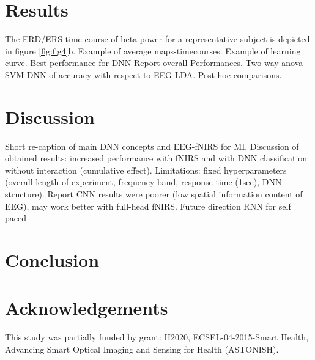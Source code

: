 \documentclass[12pt ]{iopart}
\begin{document}
\subsection{}
\section{Results}
The ERD/ERS time course of beta power for a representative subject is depicted in figure \ref{fig:fig4}b.
Example of average maps-timecourses.
Example of learning curve.
Best performance for DNN
Report overall Performances.
Two way anova SVM DNN of accuracy with respect to EEG-LDA.
Post hoc comparisons.

\section{Discussion}
Short re-caption of main DNN concepts and EEG-fNIRS for MI.
Discussion of obtained results:
increased performance with fNIRS and with DNN classification without interaction (cumulative effect).
Limitations: fixed hyperparameters
(overall length of experiment, frequency band, response time (1sec), DNN structure). 
Report CNN results were poorer (low spatial information content of EEG), may work better with full-head fNIRS.
Future direction RNN for self paced






\section{Conclusion}

\section{Acknowledgements}
This study was partially funded by grant: H2020, ECSEL-04-2015-Smart Health, Advancing Smart Optical Imaging and Sensing for Health (ASTONISH).
 
\end{document}
